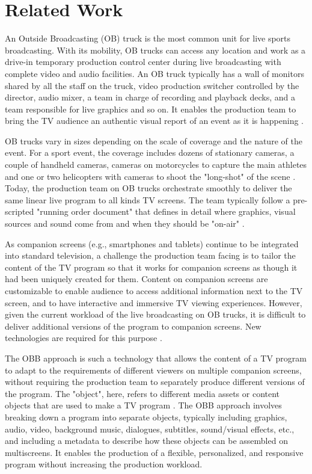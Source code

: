 \documentclass[sigchi-a, authorversion]{acmart}
\begin{document}
\section{Related Work}
An Outside Broadcasting (OB) truck is the most common unit for live sports broadcasting. With its mobility, OB trucks can access any location and work as a drive-in temporary production control center during live broadcasting with complete video and audio facilities. An OB truck typically has a wall of monitors shared by all the staff on the truck, video production switcher controlled by the director, audio mixer, a team in charge of recording and playback decks, and a team responsible for live graphics and so on. It enables the production team to bring the TV audience an authentic visual report of an event as it is happening \cite{owens2012, owens2015}.

OB trucks vary in sizes depending on the scale of coverage and the nature of the event. For a sport event, the coverage includes dozens of stationary cameras, a couple of handheld cameras, cameras on motorcycles to capture the main athletes and one or two helicopters with cameras to shoot the "long-shot" of the scene \cite{owens2012, li2018}. Today, the production team on OB trucks orchestrate smoothly to deliver the same linear live program to all kinds TV screens. The team typically follow a pre-scripted "running order document" that defines in detail where graphics, visual sources and sound come from and when they should be "on-air" \cite{li2018}. 

As companion screens (e.g., smartphones and tablets) continue to be integrated into standard television, a challenge the production team facing is to tailor the content of the TV program so that it works for companion screens as though it had been uniquely created for them. Content on companion screens are customizable to enable audience to access additional information next to the TV screen, and to have interactive and immersive TV viewing experiences\cite{bentley2017, dowell2015}. However, given the current workload of the live broadcasting on OB trucks, it is difficult to deliver additional versions of the program to companion screens. New technologies are required for this purpose \cite{li2018, armstrong2014}.

The OBB approach is such a technology that allows the content of a TV program to adapt to the requirements of different viewers on multiple companion screens, without requiring the production team to separately produce different versions of the program. The "object", here, refers to different media assets or content objects that are used to make a TV program \cite{armstrong2014}. The OBB approach involves breaking down a program into separate objects, typically including graphics, audio, video, background music, dialogues, subtitles, sound/visual effects, etc., and including a metadata to describe how these objects can be assembled on multiscreens. It enables the production of a flexible, personalized, and responsive program without increasing the production workload\cite{kegel2017, williams2016}.
\end{document}
